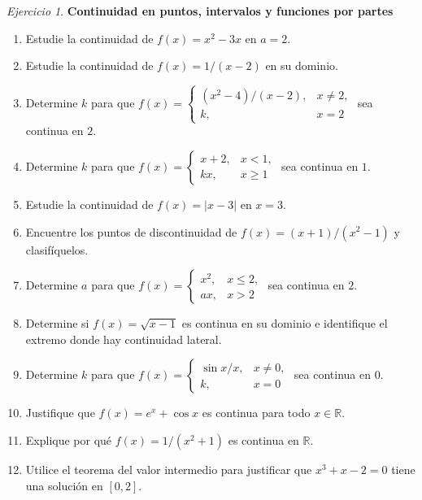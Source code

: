 \documentclass[12pt]{article}
\theoremstyle{remark}
\newtheorem{Ejer}{Ejercicio}
\newcommand{\R}{\mathbb{R}}
\begin{document}
\begin{Ejer}\textbf{Continuidad en puntos, intervalos y funciones por partes}
\begin{enumerate}[resume=banco]
\item Estudie la continuidad de $f(x)=x^2-3x$ en $a=2$.
\item Estudie la continuidad de $f(x)=1/(x-2)$ en su dominio.
\item Determine $k$ para que $f(x)=\begin{cases}(x^2-4)/(x-2),&x\ne2,\\k,&x=2\end{cases}$ sea continua en $2$.
\item Determine $k$ para que $f(x)=\begin{cases}x+2,&x<1,\\kx,&x\ge1\end{cases}$ sea continua en $1$.
\item Estudie la continuidad de $f(x)=|x-3|$ en $x=3$.
\item Encuentre los puntos de discontinuidad de $f(x)=(x+1)/(x^2-1)$ y clasifíquelos.
\item Determine $a$ para que $f(x)=\begin{cases}x^2,&x\le2,\\ax,&x>2\end{cases}$ sea continua en $2$.
\item Determine si $f(x)=\sqrt{x-1}$ es continua en su dominio e identifique el extremo donde hay continuidad lateral.
\item Determine $k$ para que $f(x)=\begin{cases}\sin x/x,&x\ne0,\\k,&x=0\end{cases}$ sea continua en $0$.
\item Justifique que $f(x)=e^x+\cos x$ es continua para todo $x\in\R$.
\item Explique por qué $f(x)=1/(x^2+1)$ es continua en $\R$.
\item Utilice el teorema del valor intermedio para justificar que $x^3+x-2=0$ tiene una solución en $[0,2]$.
\end{enumerate}
\end{Ejer}
\end{document}
